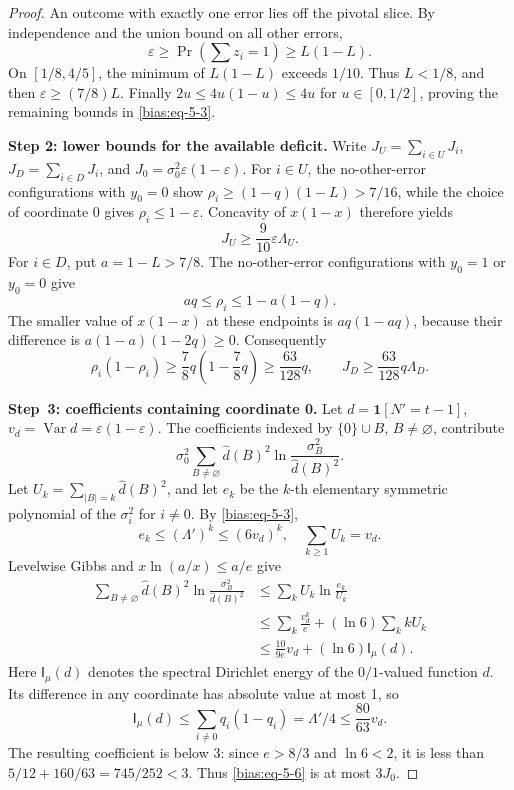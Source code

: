 \documentclass[11pt]{amsart}
\theoremstyle{definition}
\theoremstyle{remark}
\newcommand{\I}{\mathsf I}
\begin{document}
\begin{proof}
An outcome with exactly one error lies off the pivotal slice. By independence and the union bound on all other errors, \[
 \varepsilon\ge\Pr\!\left(\sum z_i=1\right)\ge L(1-L).
\] On \([1/8,4/5]\), the minimum of \(L(1-L)\) exceeds \(1/10\). Thus \(L<1/8\), and then \(\varepsilon\ge(7/8)L\). Finally \(2u\le4u(1-u)\le4u\) for \(u\in[0,1/2]\), proving the remaining bounds in \eqref{bias:eq-5-3}.

\textbf{Step 2: lower bounds for the available deficit.} Write \(J_U=\sum_{i\in U}J_i\), \(J_D=\sum_{i\in D}J_i\), and \(J_0=\sigma_0^2\varepsilon(1-\varepsilon)\). For \(i\in U\), the no-other-error configurations with \(y_0=0\) show \(\rho_i\ge(1-q)(1-L)>7/16\), while the choice of coordinate 0 gives \(\rho_i\le1-\varepsilon\). Concavity of \(x(1-x)\) therefore yields \begin{equation}\label{bias:eq-5-4}
J_U\ge\frac9{10}\varepsilon\Lambda_U.
\end{equation} For \(i\in D\), put \(a=1-L>7/8\). The no-other-error configurations with \(y_0=1\) or \(y_0=0\) give \[
 aq\le\rho_i\le1-a(1-q).
\] The smaller value of \(x(1-x)\) at these endpoints is \(aq(1-aq)\), because their difference is \(a(1-a)(1-2q)\ge0\). Consequently \begin{equation}\label{bias:eq-5-5}
\rho_i(1-\rho_i)\ge
       \frac78q\left(1-\frac78q\right)
       \ge\frac{63}{128}q,
 \qquad
 J_D\ge\frac{63}{128}q\Lambda_D.
\end{equation}

\textbf{Step~3: coefficients containing coordinate 0.} Let \(d=\mathbf1[N'=t-1]\), \(v_d=\operatorname{Var}d=\varepsilon(1-\varepsilon)\). The coefficients indexed by \(\{0\}\cup B\), \(B\ne\varnothing\), contribute \begin{equation}\label{bias:eq-5-6}
\sigma_0^2
    \sum_{B\ne\varnothing}\widehat d(B)^2
              \ln\frac{\sigma_B^2}{\widehat d(B)^2}.
\end{equation} Let \(U_k=\sum_{|B|=k}\widehat d(B)^2\), and let \(e_k\) be the \(k\)-th elementary symmetric polynomial of the \(\sigma_i^2\) for \(i\ne0\). By \eqref{bias:eq-5-3}, \[
 e_k\le(\Lambda')^k\le(6v_d)^k,
 \quad \sum_{k\ge1}U_k=v_d.
\] Levelwise Gibbs and \(x\ln(a/x)\le a/e\) give \[
 \begin{aligned}
 \sum_{B\ne\varnothing}\widehat d(B)^2
              \ln\frac{\sigma_B^2}{\widehat d(B)^2}
 &\le\sum_k U_k\ln\frac{e_k}{U_k}\\
 &\le\sum_k\frac{v_d^k}{e}
             +(\ln6)\sum_k kU_k\\
 &\le\frac{10}{9e}v_d+(\ln6)\I_\mu(d).
 \end{aligned}
\] Here \(\I_\mu(d)\) denotes the spectral Dirichlet energy of the \(0/1\)-valued function \(d\). Its difference in any coordinate has absolute value at most 1, so \[
 \I_\mu(d)\le\sum_{i\ne0}q_i(1-q_i)
       =\Lambda'/4\le\frac{80}{63}v_d.
\] The resulting coefficient is below 3: since \(e>8/3\) and \(\ln6<2\), it is less than \(5/12+160/63=745/252<3\). Thus \eqref{bias:eq-5-6} is at most \(3J_0\).


\end{proof}
\end{document}
